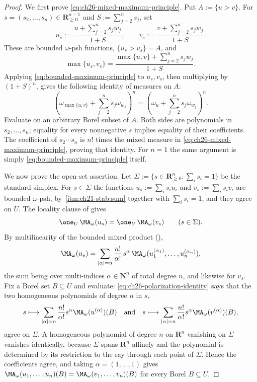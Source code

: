 \begin{proof}
We first prove \eqref{eq:ch26-mixed-maximum-principle}.  Put
\(A:=\{u>v\}\).  For \(s=(s_2,\ldots,s_n)\in\mathbf R_{\geq0}^{n-1}\)
and \(S:=\sum_{j=2}^ns_j\), set
\[
 u_s:=\frac{u+\sum_{j=2}^ns_jw_j}{1+S},
 \qquad
 v_s:=\frac{v+\sum_{j=2}^ns_jw_j}{1+S}.
\]
These are bounded \(\omega\)-psh functions,
\(\{u_s>v_s\}=A\), and
\[
 \max\{u_s,v_s\}
 =\frac{\max\{u,v\}+\sum_{j=2}^ns_jw_j}{1+S}.
\]
Applying \eqref{eq:bounded-maximum-principle} to \(u_s,v_s\), then
multiplying by \((1+S)^n\), gives the following identity of measures on
\(A\):
\[
 \left(\omega_{\max\{u,v\}}+\sum_{j=2}^ns_j\omega_{w_j}\right)^{\!n}
 =
 \left(\omega_u+\sum_{j=2}^ns_j\omega_{w_j}\right)^{\!n}.
\]
Evaluate on an arbitrary Borel subset of \(A\).  Both sides are
polynomials in \(s_2,\ldots,s_n\); equality for every nonnegative \(s\)
implies equality of their coefficients.  The coefficient of
\(s_2\cdots s_n\) is \(n!\) times the mixed measure in
\eqref{eq:ch26-mixed-maximum-principle}, proving that identity.  For
\(n=1\) the same argument is simply
\eqref{eq:bounded-maximum-principle} itself.

We now prove the open-set assertion.
Let \(\Sigma:=\{s\in\mathbf R_{\geq0}^n:\sum_is_i=1\}\) be the standard
simplex.  For \(s\in\Sigma\) the functions
\(u_s:=\sum_is_iu_i\) and \(v_s:=\sum_is_iv_i\) are bounded
\(\omega\)-psh, by
\,\cref{itm:ch21-stab:sum} together with
\(\sum_is_i=1\), and they agree on \(U\).  The locality clause of
 gives
\begin{equation}
\label{eq:ch26-polarization-identity}
 \one_U\,\MA_\omega(u_s)=\one_U\,\MA_\omega(v_s)
 \qquad(s\in\Sigma).
\end{equation}
By multilinearity of the bounded mixed product
(),
\[
 \MA_\omega(u_s)
 =\sum_{|\alpha|=n}\frac{n!}{\alpha!}\,s^\alpha\,
   \MA_\omega(u_1^{(\alpha_1)},\ldots,u_n^{(\alpha_n)}),
\]
the sum being over multi-indices \(\alpha\in\mathbf N^n\) of total degree
\(n\), and likewise for \(v_s\).  Fix a Borel set \(B\subseteq U\) and
evaluate: \eqref{eq:ch26-polarization-identity} says that the two
homogeneous polynomials of degree \(n\) in \(s\),
\[
 s\longmapsto\sum_{|\alpha|=n}\frac{n!}{\alpha!}s^\alpha
  \MA_\omega(u^{(\alpha)})(B)
 \quad\text{and}\quad
 s\longmapsto\sum_{|\alpha|=n}\frac{n!}{\alpha!}s^\alpha
  \MA_\omega(v^{(\alpha)})(B),
\]
agree on \(\Sigma\).  A homogeneous polynomial of degree \(n\) on
\(\mathbf R^n\) vanishing on \(\Sigma\) vanishes identically, because
\(\Sigma\) spans \(\mathbf R^n\) affinely and the polynomial is determined by
its restriction to the ray through each point of \(\Sigma\).  Hence the
coefficients agree, and taking \(\alpha=(1,\ldots,1)\) gives
\(\MA_\omega(u_1,\ldots,u_n)(B)=\MA_\omega(v_1,\ldots,v_n)(B)\) for every
Borel \(B\subseteq U\).
\end{proof}

